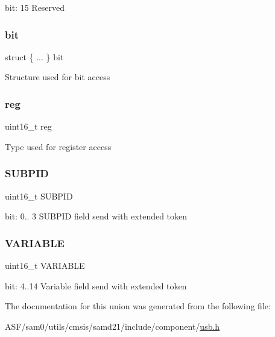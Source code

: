 bit\+: 15 Reserved \mbox{\label{union_u_s_b___d_e_v_i_c_e___e_x_t_r_e_g___type_a5ea0f6156b7671f93bf2656ba759498e}} 
\subsubsection{\texorpdfstring{bit}{bit}}
{\footnotesize\ttfamily struct \{ ... \}   bit}

Structure used for bit access \mbox{\label{union_u_s_b___d_e_v_i_c_e___e_x_t_r_e_g___type_a11760f5020019f4aa8cb02e694f7cc44}} 
\subsubsection{\texorpdfstring{reg}{reg}}
{\footnotesize\ttfamily uint16\+\_\+t reg}

Type used for register access \mbox{\label{union_u_s_b___d_e_v_i_c_e___e_x_t_r_e_g___type_afd031d1cb3ff27616a046fd5bc5b8d0c}} 
\subsubsection{\texorpdfstring{SUBPID}{SUBPID}}
{\footnotesize\ttfamily uint16\+\_\+t S\+U\+B\+P\+ID}

bit\+: 0.. 3 S\+U\+B\+P\+ID field send with extended token \mbox{\label{union_u_s_b___d_e_v_i_c_e___e_x_t_r_e_g___type_a93176bd4b468edc2704474a2aa255b5f}} 
\subsubsection{\texorpdfstring{VARIABLE}{VARIABLE}}
{\footnotesize\ttfamily uint16\+\_\+t V\+A\+R\+I\+A\+B\+LE}

bit\+: 4..14 Variable field send with extended token 

The documentation for this union was generated from the following file\+:\begin{DoxyCompactItemize}
\item 
A\+S\+F/sam0/utils/cmsis/samd21/include/component/\mbox{\hyperlink{component_2usb_8h}{usb.\+h}}\end{DoxyCompactItemize}
